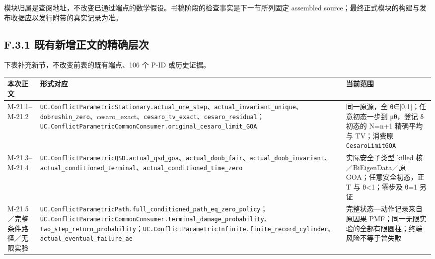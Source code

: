 \documentclass[
  11pt,
  oneside]{book}
\newcounter{none} %
\begin{document}
模块归属是查阅地址，不改变已通过端点的数学假设。书稿阶段的检查事实是下一节所列固定 assembled source；最终正式模块的构建与发布收据应以发行附带的真实记录为准。

\subsection{F.3.1 既有新增正文的精确层次}\label{f.3.1-ux65e2ux6709ux65b0ux589eux6b63ux6587ux7684ux7cbeux786eux5c42ux6b21}

下表补充新节，不改变前表的既有端点、106 个 P-ID 或历史证据。

{\def\LTcaptype{none} %
\begin{longtable}[]{@{}
  >{\raggedright\arraybackslash}p{}
  >{\raggedright\arraybackslash}p{}
  >{\raggedright\arraybackslash}p{}@{}}
\toprule\noalign{}
\begin{minipage}[b]{\linewidth}\raggedright
本次正文
\end{minipage} & \begin{minipage}[b]{\linewidth}\raggedright
形式对应
\end{minipage} & \begin{minipage}[b]{\linewidth}\raggedright
当前范围
\end{minipage} \\
\midrule\noalign{}
\endhead
\bottomrule\noalign{}
\endlastfoot
M-21.1--M-21.2 & \nolinkurl{UC.ConflictParametricStationary.actual_one_step}、\nolinkurl{actual_invariant_unique}、\nolinkurl{dobrushin_zero}、cesaro\_exact、\nolinkurl{cesaro_tv_exact}、\nolinkurl{cesaro_residual}；\nolinkurl{UC.ConflictParametricCommonConsumer.original_cesaro_limit_GOA} & 同一原源，全 θ∈{[}0,1{]}；任意初态一步到 μθ，登记 δ 初态的 N=n+1 精确平均与 TV；消费原 \nolinkurl{CesaroLimitGOA} \\
M-21.3--M-21.4 & \nolinkurl{UC.ConflictParametricQSD.actual_qsd_goa}、\nolinkurl{actual_doob_fair}、\nolinkurl{actual_doob_invariant}、\nolinkurl{actual_conditioned_terminal}、\nolinkurl{actual_conditioned_time_zero} & 实际安全子类型 killed 核／BiEigenData／原 GOA；任意安全初态，正 T 与 θ\textless1；零步及 θ=1 另证 \\
M-21.5／完整条件路径／无限实验 & \nolinkurl{UC.ConflictParametricPath.full_conditioned_path_eq_zero_policy}；\nolinkurl{UC.ConflictParametricCommonConsumer.terminal_damage_probability}、\nolinkurl{two_step_return_probability}；\nolinkurl{UC.ConflictParametricInfinite.finite_record_cylinder}、\nolinkurl{actual_eventual_failure_ae} & 完整状态---动作记录来自原因果 PMF；同一无限实验的全部有限圆柱；终端风险不等于曾失败 \\

\end{longtable}}
\end{document}
